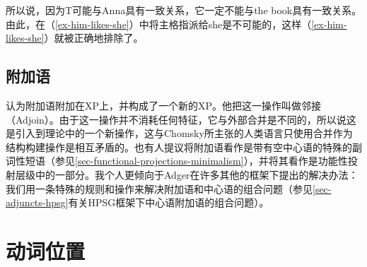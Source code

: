 所以说，因为T可能与Anna具有一致关系，它一定不能与the book具有一致关系。由此，在（\ref{ex-him-likes-she}）中将主格指派给she是不可能的，这样（\ref{ex-him-likes-she}）就被正确地排除了。

\subsection{附加语}

\citet[\S~4.2.3]{Adger2003a}认为附加语附加在XP上，并构成了一个新的XP。他把这一操作叫做邻接（Adjoin）。由于这一操作并不消耗任何特征，它与外部合并是不同的，所以说这是引入到理论中的一个新操作，这与Chomsky所主张的人类语言只使用合并作为结构构建操作是相互矛盾的。也有人提议将附加语看作是带有空中心语的特殊的副词性短语（参见\ref{sec-functional-projections-minimalism}），并将其看作是功能性投射层级中的一部分。我个人更倾向于Adger在许多其他的框架下提出的解决办法：我们用一条特殊的规则和操作来解决附加语和中心语的组合问题（参见\ref{sec-adjuncts-hpsg}有关HPSG框架下中心语附加语的组合问题）。


\section{动词位置}
\label{sec-verb-position-MP}

